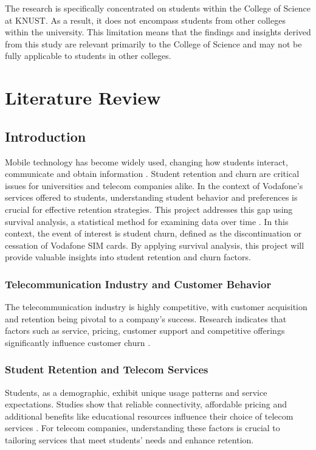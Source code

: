 \documentclass[doublespacing,12pt]{report}
\begin{document}
The research is specifically concentrated on students within the College of Science at KNUST. As a result, it does not encompass students from other colleges within the university. This limitation means that the findings and insights derived from this study are relevant primarily to the College of Science and may not be fully applicable to students in other colleges.

\newpage
\chapter{Literature Review}


\section{Introduction}
Mobile technology has become widely used, changing how students interact, communicate and obtain information \cite{Alqatani2020}. Student retention and churn are critical issues for universities and telecom companies alike. In the context of Vodafone's services offered to students, understanding student behavior and preferences is crucial for effective retention strategies. This project addresses this gap using survival analysis, a statistical method for examining data over time \cite{BoxSteffensmeier2020}. In this context, the event of interest is student churn, defined as the discontinuation or cessation of Vodafone SIM cards. By applying survival analysis, this project will provide valuable insights into student retention and churn factors.

\subsection{Telecommunication Industry and Customer Behavior}
The telecommunication industry is highly competitive, with customer acquisition and retention being pivotal to a company's success. Research indicates that factors such as service, pricing, customer support and competitive offerings significantly influence customer churn \cite{Lai2021}.

\subsection{Student Retention and Telecom Services}
Students, as a demographic, exhibit unique usage patterns and service expectations. Studies show that reliable connectivity, affordable pricing and additional benefits like educational resources influence their choice of telecom services \cite{SmithBrown2020}. For telecom companies, understanding these factors is crucial to tailoring services that meet students’ needs and enhance retention.
\end{document}
